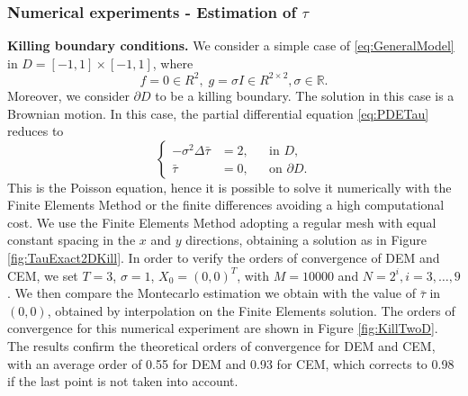 \subsubsection{Numerical experiments - Estimation of $\tau$}\label{sec:ExpTau2D}

\textbf{Killing boundary conditions.} We consider a simple case of \eqref{eq:GeneralModel} in $D = [-1,1] \times [-1,1]$, where
\begin{equation*}
	f = 0 \in R^2, \; g = \sigma I\in R^{2\times 2}, \sigma \in \mathbb{R}.
\end{equation*}
Moreover, we consider $\partial D$ to be a killing boundary. The solution in this case is a Brownian motion. In this case, the partial differential equation \eqref{eq:PDETau} reduces to
\begin{equation}\label{eq:PDETau2DKilling}
	\left \{
  	\begin{aligned}
	- \sigma^2 \Delta \bar \tau &= 2, && \text{in } D, \\
	\bar \tau &= 0, && \text{on } \partial D.
	\end{aligned} \right.
\end{equation}
This is the Poisson equation, hence it is possible to solve it numerically with the Finite Elements Method or the finite differences avoiding a high computational cost. We use the Finite Elements Method adopting a regular mesh with equal constant spacing in the $x$ and $y$ directions, obtaining a solution as in Figure \ref{fig:TauExact2DKill}. In order to verify the orders of convergence of DEM and CEM, we set $T = 3$, $\sigma = 1$, $X_0 = (0,0)^T$, with $M = 10000$ and $N = 2^i,i=3,\dots,9$. We then compare the Montecarlo estimation we obtain with the value of $\bar\tau$ in $(0,0)$, obtained by interpolation on the Finite Elements solution. The orders of convergence for this numerical experiment are shown in Figure \ref{fig:KillTwoD}. The results confirm the theoretical orders of convergence for DEM and CEM, with an average order of 0.55 for DEM and 0.93 for CEM, which corrects to 0.98 if the last point is not taken into account.

